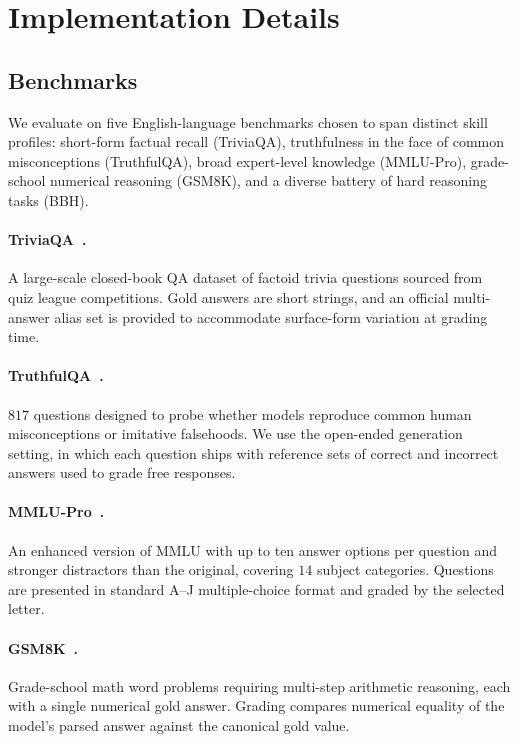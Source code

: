 \section{Implementation Details}
\label{app:experimental_setup}
\subsection{Benchmarks}
We evaluate on five English-language benchmarks chosen to span
distinct skill profiles: short-form factual recall (TriviaQA),
truthfulness in the face of common misconceptions (TruthfulQA), broad expert-level knowledge (MMLU-Pro), grade-school numerical reasoning (GSM8K), and a diverse battery of hard reasoning tasks (BBH).

\paragraph{TriviaQA~\citep{joshi2017triviaqalargescaledistantly}.}
A large-scale closed-book QA dataset of factoid trivia questions sourced from quiz league competitions. Gold answers are short strings, and an official multi-answer alias set is provided to accommodate surface-form variation at grading time.

\paragraph{TruthfulQA~\citep{lin2022truthfulqameasuringmodelsmimic}.}
$817$ questions designed to probe whether models reproduce common
human misconceptions or imitative falsehoods. We use the
open-ended generation setting, in which each question ships with
reference sets of correct and incorrect answers used to grade free
responses.

\paragraph{MMLU-Pro~\citep{wang2024mmluprorobustchallengingmultitask}.}
An enhanced version of MMLU with up to ten answer options per
question and stronger distractors than the original, covering
$14$ subject categories. Questions are presented in standard
A--J multiple-choice format and graded by the selected letter.

\paragraph{GSM8K~\citep{cobbe2021trainingverifierssolvemath}.}
Grade-school math word problems requiring multi-step arithmetic reasoning, each with a single numerical gold answer. Grading compares numerical equality of the model's parsed answer against the canonical gold value.

